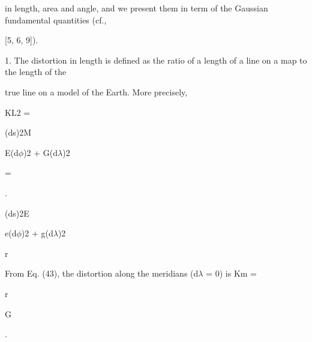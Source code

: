 \documentclass[a4paper,portrait,12pt]{article}
\begin{document}
\begin{flushleft}
in length, area and angle, and we present them in term of the Gaussian fundamental quantities (cf.,
\end{flushleft}


[5, 6, 9]).


\begin{flushleft}
1. The distortion in length is defined as the ratio of a length of a line on a map to the length of the
\end{flushleft}


\begin{flushleft}
true line on a model of the Earth. More precisely,
\end{flushleft}


\begin{flushleft}
KL2 =
\end{flushleft}





\begin{flushleft}
(ds)2M
\end{flushleft}


\begin{flushleft}
E(d$\phi$)2 + G(d$\lambda$)2
\end{flushleft}


=


.


\begin{flushleft}
(ds)2E
\end{flushleft}


\begin{flushleft}
e(d$\phi$)2 + g(d$\lambda$)2
\end{flushleft}


\begin{flushleft}
r
\end{flushleft}





\begin{flushleft}
From Eq. (43), the distortion along the meridians (d$\lambda$ = 0) is Km =
\end{flushleft}


\begin{flushleft}
r
\end{flushleft}


\begin{flushleft}
G
\end{flushleft}


.
\end{document}
